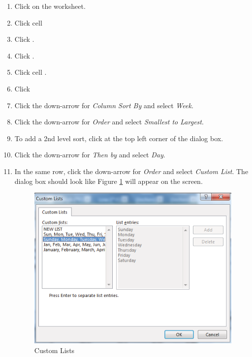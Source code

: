 \begin{enumbox}
	\begin{enumerate}
		\item Click on the  worksheet.
		\item Click cell 
		\item Click .
		\item Click .
		\item Click cell .
		\item Click 	
		\item Click the down-arrow for \textit{Column Sort By} and select \textit{Week}.
		\item Click the down-arrow for \textit{Order} and select \textit{Smallest to Largest}.
		\item To add a 2nd level sort, click  at the top left corner of the dialog box.
		\item Click the down-arrow for \textit{Then by} and select \textit{Day}.
		\item In the same row, click the down-arrow for \textit{Order} and select \textit{Custom List}. The dialog box should look like Figure \ref{05:fig13} will appear on the screen.

		\begin{figure}[H]
			\centering
			\includegraphics[width=\maxwidth{.95\linewidth}]{gfx/ch05_fig13}
			\caption{Custom Lists}
			\label{05:fig13}
		\end{figure}


\end{enumerate}
\end{enumbox}
